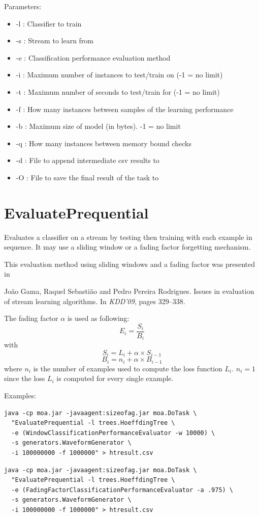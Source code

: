 \documentclass[a4paper,12pt,twoside]{book}
\begin{document}
Parameters:
\begin{itemize}
\item -l : Classifier to train
\item -s : Stream to learn from
\item -e : Classification performance evaluation method
\item -i : Maximum number of instances to test/train on  (-1 = no limit)
\item -t : Maximum number of seconds to test/train for (-1 = no limit)
\item -f : How many instances between samples of the learning performance
\item -b : Maximum size of model (in bytes). -1 = no limit
\item -q : How many instances between memory bound checks
\item -d : File to append intermediate csv results to
\item -O : File to save the final result of the task to
\end{itemize}



\section{EvaluatePrequential}
 Evaluates a classifier on a stream by testing then training with each example in sequence.
It may use a sliding window or a fading factor forgetting mechanism.

This evaluation method using sliding windows and a fading factor was presented in

\begin{itemize}
Jo{\~a}o Gama, Raquel Sebasti{\~a}o and Pedro Pereira Rodrigues.
\newblock Issues in evaluation of stream learning algorithms.
\newblock In {\em KDD'09}, pages 329--338.\end{itemize}

The fading factor $\alpha$ is used as following:
$$E_i = \frac{S_i} {B_i}$$
with
 $$S_i = L_i + \alpha \times S_{i-1}$$ $$B_i = n_i + \alpha \times B_{i-1}$$
where $n_i$ is the number of examples used to compute the loss function $L_i$.
$n_i = 1$ since the loss $L_i$ is computed for every single example.


Examples:
\begin{footnotesize}\begin{verbatim}
java -cp moa.jar -javaagent:sizeofag.jar moa.DoTask \
  "EvaluatePrequential -l trees.HoeffdingTree \
  -e (WindowClassificationPerformanceEvaluator -w 10000) \
  -s generators.WaveformGenerator \
  -i 100000000 -f 1000000" > htresult.csv
\end{verbatim}
\begin{verbatim}
java -cp moa.jar -javaagent:sizeofag.jar moa.DoTask \
  "EvaluatePrequential -l trees.HoeffdingTree \
  -e (FadingFactorClassificationPerformanceEvaluator -a .975) \
  -s generators.WaveformGenerator \
  -i 100000000 -f 1000000" > htresult.csv
\end{verbatim}

\end{footnotesize}
\end{document}
